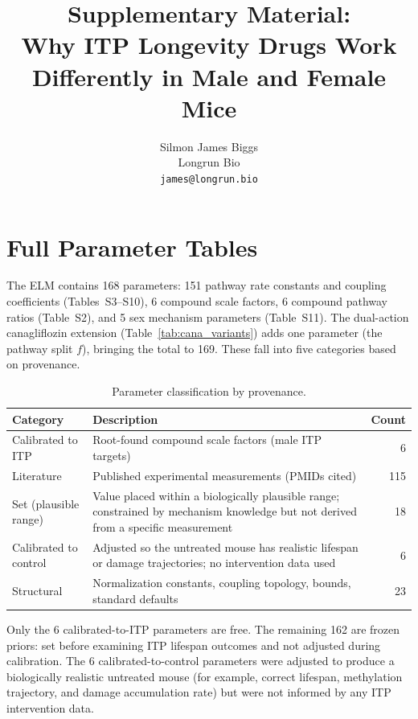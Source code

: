 \documentclass[11pt]{article}
\title{Supplementary Material:\\Why ITP Longevity Drugs Work Differently in Male and Female Mice}
\author{Silmon James Biggs\\[0.3em]
\normalsize Longrun Bio\\
\normalsize \texttt{james@longrun.bio}}
\date{}
\begin{document}
\maketitle

\setcounter{section}{0}
\renewcommand{\thesection}{S\arabic{section}}
\renewcommand{\thetable}{S\arabic{table}}
\renewcommand{\theequation}{S\arabic{equation}}
\renewcommand{\thefigure}{S\arabic{figure}}

\section{Full Parameter Tables}
\label{sec:params}

The ELM contains 168 parameters: 151 pathway rate constants and coupling coefficients (Tables~S3--S10), 6 compound scale factors, 6 compound pathway ratios (Table~S2), and 5 sex mechanism parameters (Table~S11). The dual-action canagliflozin extension (Table~\ref{tab:cana_variants}) adds one parameter (the pathway split $f$), bringing the total to 169. These fall into five categories based on provenance.

\begin{table}[H]
\centering
\caption{Parameter classification by provenance.}
\begin{tabular}{@{}lp{8cm}r@{}}
\toprule
Category & Description & Count \\
\midrule
Calibrated to ITP & Root-found compound scale factors (male ITP targets) & 6 \\
Literature & Published experimental measurements (PMIDs cited) & 115 \\
Set (plausible range) & Value placed within a biologically plausible range; constrained by mechanism knowledge but not derived from a specific measurement & 18 \\
Calibrated to control & Adjusted so the untreated mouse has realistic lifespan or damage trajectories; no intervention data used & 6 \\
Structural & Normalization constants, coupling topology, bounds, standard defaults & 23 \\
\bottomrule
\end{tabular}
\end{table}

Only the 6 calibrated-to-ITP parameters are free. The remaining 162 are frozen priors: set before examining ITP lifespan outcomes and not adjusted during calibration. The 6 calibrated-to-control parameters were adjusted to produce a biologically realistic untreated mouse (for example, correct lifespan, methylation trajectory, and damage accumulation rate) but were not informed by any ITP intervention data.
\end{document}
